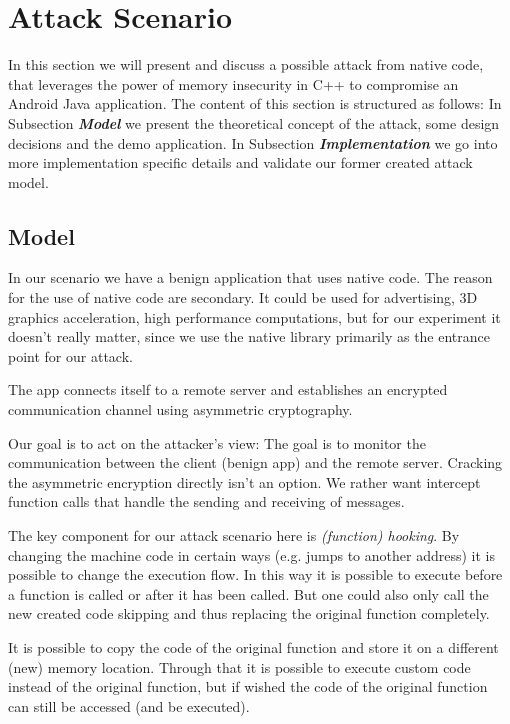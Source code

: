 


\section{Attack Scenario}
In this section we will present and discuss a possible attack from native code, that leverages the power of memory insecurity in C++ to compromise an Android Java application. The content of this section is structured as follows: In Subsection \emph{\textbf{Model}} we present the theoretical concept of the attack, some design decisions and the demo application. 
In Subsection \emph{\textbf{Implementation}} we go into more implementation specific details and validate our former created attack model.

\subsection{Model}

In our scenario we have a benign application that uses native code.
The reason for the use of native code are secondary. It could be used for advertising, 3D graphics acceleration, high performance computations, but for our experiment it doesn't really matter, since we use the native library primarily as the entrance point for our attack.

The app connects itself to a remote server and establishes an encrypted communication channel using asymmetric cryptography.
  
Our goal is to act on the attacker's view: The goal is to monitor the communication between the client (benign app) and the remote server. 
Cracking the asymmetric encryption directly isn't an option. We rather want intercept function calls that handle the sending and receiving of messages.

The key component for our attack scenario here is \emph{(function) hooking}.
By changing the machine code in certain ways (e.g. jumps to another address) it is possible to change the execution flow. In this way it is possible to execute before a function is called or after it has been called. But one could also only call the new created code skipping and thus replacing the original function completely. 

It is possible to copy the code of the original function and store it on a different (new) memory location. 
Through that it is possible to execute custom code instead of the original function, but if wished the code of the original function can still be accessed (and be executed).  

